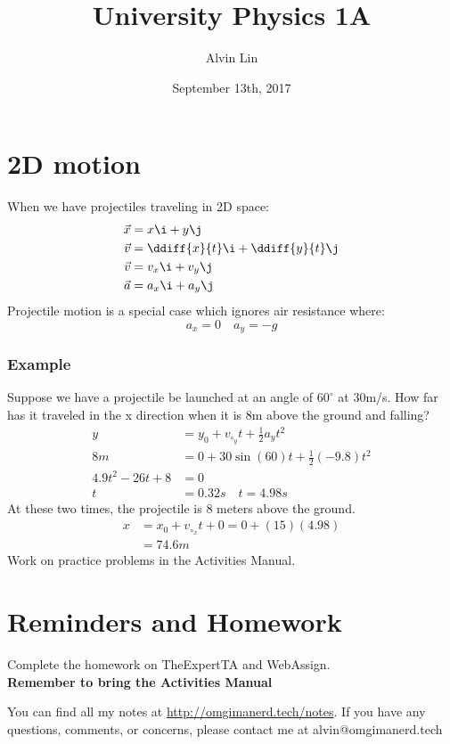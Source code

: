 \documentclass{math}
\title{University Physics 1A}
\author{Alvin Lin}
\date{September 13th, 2017}
\begin{document}
\maketitle

\section*{2D motion}
When we have projectiles traveling in 2D space:
\begin{align*}
  \vec{x} &= x\i+y\j \\
  \vec{v} &= \ddiff{x}{t}\i+\ddiff{y}{t}\j \\
  \vec{v} &= v_x\i+v_y\j \\
  \vec{a} &= a_x\i+a_y\j
\end{align*}
Projectile motion is a special case which ignores air resistance where:
\[ a_x = 0 \quad a_y = -g \]

\subsubsection*{Example}
Suppose we have a projectile be launched at an angle of \( 60^{\circ} \) at
30m/s. How far has it traveled in the x direction when it is 8m above the
ground and falling?
\begin{align*}
  y &= y_0+v_{\circ_y}t+\frac{1}{2}a_yt^2 \\
  8m &= 0+30\sin(60)t+\frac{1}{2}(-9.8)t^2 \\
  4.9t^2-26t+8 &= 0 \\
  t &= 0.32s \quad t = 4.98s
\end{align*}
At these two times, the projectile is 8 meters above the ground.
\begin{align*}
  x &= x_0+v_{\circ_x}t+0 = 0+(15)(4.98) \\
  &= 74.6m
\end{align*}
Work on practice problems in the Activities Manual.

\section*{Reminders and Homework}
Complete the homework on TheExpertTA and WebAssign. \\
\textbf{Remember to bring the Activities Manual}

\begin{center}
  You can find all my notes at \url{http://omgimanerd.tech/notes}. If you have
  any questions, comments, or concerns, please contact me at
  alvin@omgimanerd.tech
\end{center}
\end{document}

